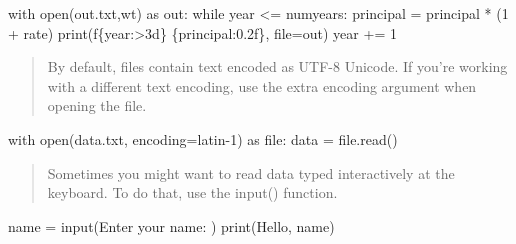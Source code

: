 \documentclass[
  letterpaper,
  DIV=11,
  numbers=noendperiod]{scrreprt}
\newenvironment{Shaded}{\begin{snugshade}}{\end{snugshade}}
\newcommand{\BuiltInTok}[1]{\textcolor[rgb]{0.00,0.46,0.62}{#1}}
\newcommand{\ControlFlowTok}[1]{\textcolor[rgb]{0.00,0.46,0.62}{#1}}
\newcommand{\DecValTok}[1]{\textcolor[rgb]{0.68,0.00,0.00}{#1}}
\newcommand{\ImportTok}[1]{\textcolor[rgb]{0.00,0.46,0.62}{#1}}
\newcommand{\NormalTok}[1]{\textcolor[rgb]{0.00,0.46,0.62}{#1}}
\newcommand{\OperatorTok}[1]{\textcolor[rgb]{0.37,0.37,0.37}{#1}}
\newcommand{\SpecialCharTok}[1]{\textcolor[rgb]{0.37,0.37,0.37}{#1}}
\newcommand{\SpecialStringTok}[1]{\textcolor[rgb]{0.13,0.47,0.30}{#1}}
\newcommand{\StringTok}[1]{\textcolor[rgb]{0.13,0.47,0.30}{#1}}
\begin{document}
\begin{Shaded}
\begin{Highlighting}[]
\ControlFlowTok{with} \BuiltInTok{open}\NormalTok{(}\StringTok{\textquotesingle{}out.txt\textquotesingle{}}\NormalTok{,}\StringTok{\textquotesingle{}wt\textquotesingle{}}\NormalTok{) }\ImportTok{as}\NormalTok{ out: }
    \ControlFlowTok{while}\NormalTok{ year  }\OperatorTok{\textless{}=}\NormalTok{  numyears: }
\NormalTok{          principal }\OperatorTok{=}\NormalTok{   principal   }\OperatorTok{*}\NormalTok{   (}\DecValTok{1}  \OperatorTok{+}\NormalTok{ rate)     }
          \BuiltInTok{print}\NormalTok{(}\SpecialStringTok{f\textquotesingle{}}\SpecialCharTok{\{}\NormalTok{year}\SpecialCharTok{:\textgreater{}3d\}}\SpecialStringTok{    }\SpecialCharTok{\{}\NormalTok{principal}\SpecialCharTok{:0.2f\}}\SpecialStringTok{\textquotesingle{}}\NormalTok{,  }\BuiltInTok{file}\OperatorTok{=}\NormalTok{out)}
\NormalTok{          year  }\OperatorTok{+=}  \DecValTok{1}
\end{Highlighting}
\end{Shaded}

\begin{quote}
By default, files contain text encoded as UTF-8 Unicode. If you're
working with a different text encoding, use the extra encoding argument
when opening the file.
\end{quote}

\begin{Shaded}
\begin{Highlighting}[]
\ControlFlowTok{with} \BuiltInTok{open}\NormalTok{(}\StringTok{\textquotesingle{}data.txt\textquotesingle{}}\NormalTok{, encoding}\OperatorTok{=}\StringTok{\textquotesingle{}latin{-}1\textquotesingle{}}\NormalTok{)   }\ImportTok{as}  \BuiltInTok{file}\NormalTok{:}
\NormalTok{    data }\OperatorTok{=} \BuiltInTok{file}\NormalTok{.read()}
\end{Highlighting}
\end{Shaded}

\begin{quote}
Sometimes you might want to read data typed interactively at the
keyboard. To do that, use the input() function.
\end{quote}

\begin{Shaded}
\begin{Highlighting}[]
\NormalTok{name }\OperatorTok{=}  \BuiltInTok{input}\NormalTok{(}\StringTok{\textquotesingle{}Enter your name: \textquotesingle{}}\NormalTok{) }
\BuiltInTok{print}\NormalTok{(}\StringTok{\textquotesingle{}Hello\textquotesingle{}}\NormalTok{,  name)}
\end{Highlighting}
\end{Shaded}
\end{document}
